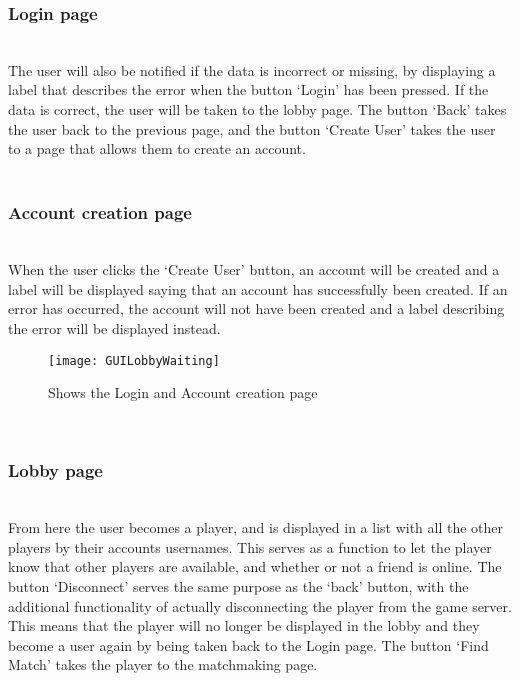 \subsubsection{Login page}
\\
The user will also be notified if the data is incorrect or missing, by
 displaying a label that describes the error when the button ‘Login’ has
  been pressed. If the data is correct, the user will be taken to the lobby
	page. The button ‘Back’ takes the user back to the previous page, and the
	 button ‘Create User’ takes the user to a page that allows them to create
	  an account.
\\
\\
\subsubsection{Account creation page}
\\
When the user clicks the ‘Create User’ button, an account will be created
and a label will be displayed saying that an account has successfully been
 created. If an error has occurred, the account will not have been created
 and a label describing the error will be displayed instead.
\begin{figure}[h]
	\centerline{\texttt{[image: GUILobbyWaiting]}}
	\caption{Shows the Login and Account creation  page}
\end{figure}
\\
\subsubsection{Lobby page}
\\
From here the user becomes a player, and is displayed in a list with all
 the other players by their accounts usernames. This serves as a function to
 let the player know that other players are available, and whether or not a
  friend is online. The button ‘Disconnect’ serves the same purpose as the
	‘back’ button, with the additional functionality of actually disconnecting
	 the player from the game server. This means that the player will no longer
	  be displayed in the lobby and they become a user again by being taken back
		 to the Login page. The button ‘Find Match’ takes the player to the
		  matchmaking page.
\\
\\

